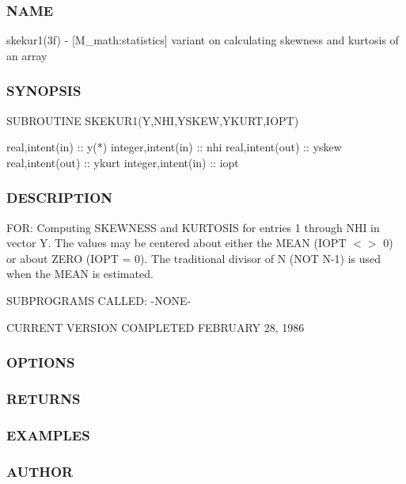 \subsubsection*{N\+A\+ME}

skekur1(3f) -\/ \mbox{[}M\+\_\+math\+:statistics\mbox{]} variant on calculating skewness and kurtosis of an array 

\subsubsection*{S\+Y\+N\+O\+P\+S\+IS}

\begin{DoxyVerb}SUBROUTINE SKEKUR1(Y,NHI,YSKEW,YKURT,IOPT)

 real,intent(in)    ::  y(*)
 integer,intent(in) :: nhi
 real,intent(out)   :: yskew
 real,intent(out)   :: ykurt
 integer,intent(in) :: iopt
\end{DoxyVerb}


\subsubsection*{D\+E\+S\+C\+R\+I\+P\+T\+I\+ON}

F\+OR\+: Computing S\+K\+E\+W\+N\+E\+SS and K\+U\+R\+T\+O\+S\+IS for entries 1 through N\+HI in vector Y. The values may be centered about either the M\+E\+AN (I\+O\+PT $<$$>$ 0) or about Z\+E\+RO (I\+O\+PT = 0). The traditional divisor of N (N\+OT N-\/1) is used when the M\+E\+AN is estimated.

S\+U\+B\+P\+R\+O\+G\+R\+A\+MS C\+A\+L\+L\+ED\+: -\/\+N\+O\+N\+E-\/

C\+U\+R\+R\+E\+NT V\+E\+R\+S\+I\+ON C\+O\+M\+P\+L\+E\+T\+ED F\+E\+B\+R\+U\+A\+RY 28, 1986 \subsubsection*{O\+P\+T\+I\+O\+NS}

\subsubsection*{R\+E\+T\+U\+R\+NS}

\subsubsection*{E\+X\+A\+M\+P\+L\+ES}

\subsubsection*{A\+U\+T\+H\+OR}

